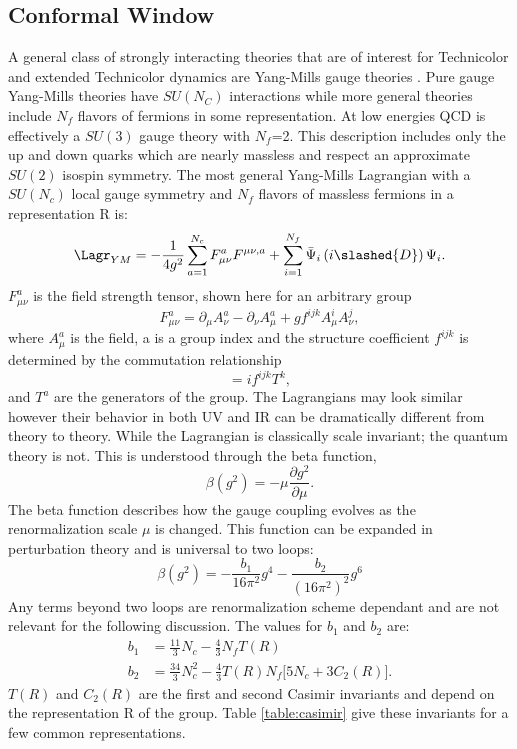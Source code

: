 \subsection{Conformal Window}
\label{sec:sec:conformalwindow}
A general class of strongly interacting theories that are of interest for Technicolor and extended Technicolor dynamics are Yang-Mills gauge theories \cite{DeGrand:2010ba,DeGrand:2009mt}.
Pure gauge Yang-Mills theories have $SU(N_C)$ interactions while more general theories include $N_f$ flavors of fermions in some representation.
At low energies QCD is effectively a $SU(3)$ gauge theory with $N_f$=2.
This description includes only the up and down quarks which are nearly massless and respect an approximate $SU(2)$ isospin symmetry.
The most general Yang-Mills Lagrangian with a $SU(N_c)$ local gauge symmetry and $N_f$ flavors of massless fermions in a representation R is:
\begin{equation}
  \Lagr_{YM}=-\frac{1}{4g^2}\sum\limits_{a=1}^{N_c} F^a_{\mu\nu}F^{\mu\nu,a}+\sum\limits_{i=1}^{N_f} \bar\Psi_i\left(i\slashed{D}\right)\Psi_i.  
\end{equation}
$F^a_{\mu\nu}$ is the field strength tensor, shown here for an arbitrary group
\begin{equation}
  F^a_{\mu\nu}=\partial_\mu A^a_\nu-\partial_\nu A^a_\mu + gf^{ijk}A^i_\mu A^j_\nu,
\end{equation}
where $A^a_\mu$ is the field, a is a group index and the structure coefficient $f^{ijk}$ is determined by the commutation relationship
\begin{equation}
  [T^i,T^j]=if^{ijk}T^k,
\end{equation}
and $T^a$ are the generators of the group.
The Lagrangians may look similar however their behavior in both UV and IR can be dramatically different from theory to theory.
While the Lagrangian is classically scale invariant; the quantum theory is not.
This is understood through the beta function,
\begin{equation}
  \beta (g^2)=-\mu\frac{\partial g^2}{\partial \mu}.
\end{equation}
The beta function describes how the gauge coupling evolves as the renormalization scale $\mu$ is changed.
This function can be expanded in perturbation theory and is universal to two loops:
\begin{equation}
  \beta\left(g^2\right)=-\frac{b_1}{16\pi^2}g^4-\frac{b_2}{(16\pi^2)^2}g^6
\end{equation}
Any terms beyond two loops are renormalization scheme dependant and are not relevant for the following discussion.
The values for $b_1$ and $b_2$ are:
\begin{equation}
  \label{eqn:b1b2}
  \begin{aligned}
    b_1&=\frac{11}{3}N_c-\frac{4}{3}N_fT(R)\\
    b_2&=\frac{34}{3}N_c^2-\frac{4}{3}T(R)N_f\Big[5N_c+3C_2(R)\Big].
  \end{aligned}
\end{equation}
$T(R)$ and $C_2(R)$ are the first and second Casimir invariants and depend on the representation R of the group.
Table \ref{table:casimir} give these invariants for a few common representations.

